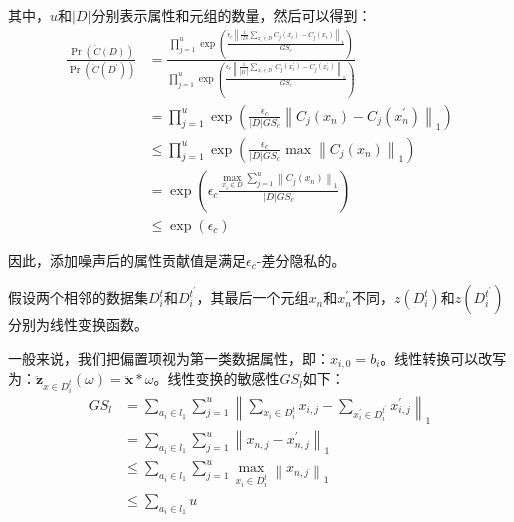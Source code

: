 其中，$u$和$|D|$分别表示属性和元组的数量，然后可以得到：
\begin{equation}\label{贡献数量和元组}
\begin{aligned}
\frac{\operatorname{Pr}(\ddot{C}(D))}{\operatorname{Pr}\left(\ddot{C}\left(D^{\prime}\right)\right)} &=\frac{\prod_{j=1}^{u} \exp \left(\frac{\epsilon_{c}\left\|\frac{1}{|D|} \sum_{x_{i} \in D} C_{j}\left(x_{i}\right)-\ddot{C}_{j}\left(x_{i}\right)\right\|_{1}}{G S_{c}}\right)}{\prod_{j=1}^{u} \exp \left(\frac{\epsilon_{c}\left\|\frac{1}{\left|D^{\prime}\right|} \sum_{x_{i}^{\prime} \in D^{\prime}} C_{j}\left(x_{i}^{\prime}\right)-\ddot{C}_{j}\left(x_{i}^{\prime}\right)\right\|_{1}}{G S_{c}}\right)} \\
&=\prod_{j=1}^{u} \exp \left(\frac{\epsilon_{c}}{|D| G S_{c}}\left\|C_{j}\left(x_{n}\right)-C_{j}\left(x_{n}^{\prime}\right)\right\|_{1}\right) \\
& \leq \prod_{j=1}^{u} \exp \left(\frac{\epsilon_{c}}{|D| G S_{c}} \max \left\|C_{j}\left(x_{n}\right)\right\|_{1}\right) \\
&=\exp \left(\epsilon_{c} \frac{\max _{x_{i} \in D} \sum_{j=1}^{u}\left\|C_{j}\left(x_{n}\right)\right\|_{1}}{|D| G S_{c}}\right) \\
& \leq \exp \left(\epsilon_{c}\right)
\end{aligned}
\end{equation}

因此，添加噪声后的属性贡献值是满足$\epsilon_{c}$-差分隐私的。

假设两个相邻的数据集$D_{i}^{t}$和$D_{i}^{t^{\prime}}$，其最后一个元组$x_{n}$和$x_{n}^{\prime}$不同，$z\left(D_{i}^{t}\right)$和$z\left(D_{i}^{t^{\prime}}\right)$分别为线性变换函数。

一般来说，我们把偏置项视为第一类数据属性，即：$x_{i,0}=b_{i}$。线性转换可以改写为：$\ddot{\mathbf{z}}_{x \in D_{i}^{t}}(\omega)=\ddot{\mathbf{x}} * \omega$。线性变换的敏感性$G S_{l}$如下：
\begin{equation}
\begin{aligned}
G S_{l} &=\sum_{a_{i} \in l_{1}} \sum_{j=1}^{u}\left\|\sum_{x_{i} \in D_{i}^{t}} x_{i, j}-\sum_{x_{i}^{\prime} \in D_{i}^{t^{\prime}}} x_{i, j}^{\prime}\right\|_{1} \\
&=\sum_{a_{i} \in l_{1}} \sum_{j=1}^{u}\left\|x_{n, j}-x_{n, j}^{\prime}\right\|_{1} \\
& \leq \sum_{a_{i} \in l_{1}} \sum_{j=1}^{u} \max _{x_{i} \in D_{i}^{t}}\left\|x_{n, j}\right\|_{1} \\
& \leq \sum_{a_{i} \in l_{1}} u
\end{aligned}
\end{equation}

